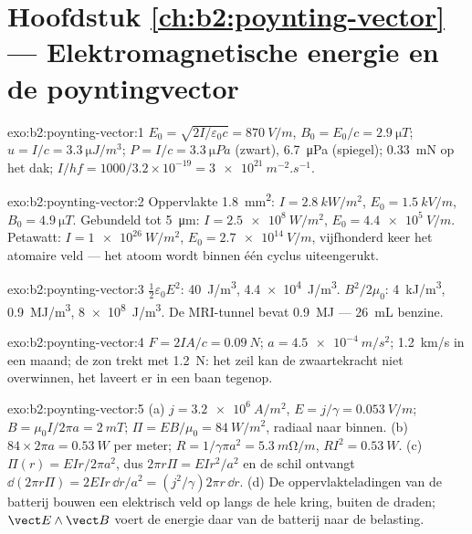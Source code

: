 \section*{Hoofdstuk \ref{ch:b2:poynting-vector} --- Elektromagnetische
energie en de poyntingvector}

\begin{solution}{exo:b2:poynting-vector:1}
$E_0 = \sqrt{2I/\varepsilon_0c} = \qty{870}{V/m}$,
$B_0 = E_0/c = \qty{2.9}{\micro T}$; $u = I/c
= \qty{3.3}{\micro J/m^3}$;
$P = I/c = \qty{3.3}{\micro Pa}$ (zwart), \qty{6.7}{\micro Pa} (spiegel);
\qty{0.33}{mN} op het dak;
$I/hf = 1000/3.2 \times 10^{-19} = \qty{3e21}{m^{-2}.s^{-1}}$.
\end{solution}

\begin{solution}{exo:b2:poynting-vector:2}
Oppervlakte \qty{1.8}{mm^2}: $I = \qty{2.8}{kW/m^2}$,
$E_0 = \qty{1.5}{kV/m}$, $B_0 = \qty{4.9}{\micro T}$. Gebundeld tot
\qty{5}{\micro m}: $I = \qty{2.5e8}{W/m^2}$, $E_0 = \qty{4.4e5}{V/m}$.
Petawatt: $I = \qty{1e26}{W/m^2}$, $E_0 = \qty{2.7e14}{V/m}$, vijfhonderd
keer het atomaire veld --- het atoom wordt binnen één cyclus uiteengerukt.
\end{solution}

\begin{solution}{exo:b2:poynting-vector:3}
$\tfrac12\varepsilon_0E^2$: \qty{40}{J/m^3}, \qty{4.4e4}{J/m^3}.
$B^2/2\mu_0$: \qty{4}{kJ/m^3}, \qty{0.9}{MJ/m^3}, \qty{8e8}{J/m^3}. De
MRI-tunnel bevat \qty{0.9}{MJ} --- \qty{26}{mL} benzine.
\end{solution}

\begin{solution}{exo:b2:poynting-vector:4}
$F = 2IA/c = \qty{0.09}{N}$; $a = \qty{4.5e-4}{m/s^2}$; \qty{1.2}{km/s} in
een maand; de zon trekt met \qty{1.2}{N}: het zeil kan de zwaartekracht niet
overwinnen, het laveert er in een baan tegenop.
\end{solution}

\begin{solution}{exo:b2:poynting-vector:5}
(a) $j = \qty{3.2e6}{A/m^2}$, $E = j/\gamma = \qty{0.053}{V/m}$;
$B = \mu_0I/2\pi a = \qty{2}{mT}$; $\Pi = EB/\mu_0 = \qty{84}{W/m^2}$,
radiaal naar binnen. (b) $84 \times 2\pi a = \qty{0.53}{W}$ per meter;
$R = 1/\gamma\pi a^2 = \qty{5.3}{m\ohm/m}$, $RI^2 = \qty{0.53}{W}$. (c)
$\Pi(r)
= EIr/2\pi a^2$, dus $2\pi r\Pi = EIr^2/a^2$ en de schil ontvangt
$\dd(2\pi r\Pi)
= 2EIr\,\dd r/a^2 = (j^2/\gamma)2\pi r\,\dd r$. (d) De
oppervlakteladingen van de batterij bouwen een elektrisch veld op langs de
hele kring, buiten de draden; $\vect E\wedge\vect B$ voert de energie daar
van de batterij naar de belasting.
\end{solution}

